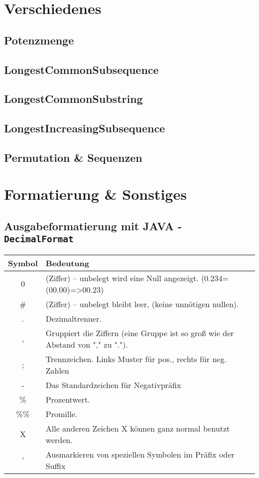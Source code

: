 \documentclass[10pt,a4paper,ngerman,oneside,twocolumn]{article}
\begin{document}
\section{Verschiedenes}
\subsection{Potenzmenge}

\subsection{LongestCommonSubsequence}

\subsection{LongestCommonSubstring}

\subsection{LongestIncreasingSubsequence}

\subsection{Permutation \& Sequenzen}

\section{Formatierung \& Sonstiges}
\subsection{Ausgabeformatierung mit JAVA - \texttt{DecimalFormat}}
\begin{tabular}{cl}
Symbol & Bedeutung\\\hline
0 &	(Ziffer) – unbelegt wird eine Null angezeigt. (0.234=(00.00)=>00.23)\\
\# &	(Ziffer) – unbelegt bleibt leer, (keine unnötigen nullen).\\
. &	Dezimaltrenner. \\
, &	Gruppiert die Ziffern (eine Gruppe ist so groß wie der Abstand von "," zu ".").\\
; &	Trennzeichen. Links Muster für pos., rechts für neg. Zahlen\\
- &	Das Standardzeichen für Negativpräfix\\
\% &	Prozentwert.\\
\%\% &	Promille.\\
X &	Alle anderen Zeichen X können ganz normal benutzt werden.\\
' &	Ausmarkieren von speziellen Symbolen im Präfix oder Suffix \\
\end{tabular}
\end{document}
